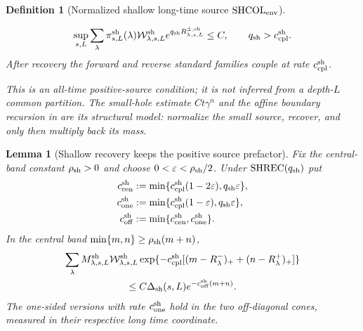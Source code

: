 \documentclass[11pt]{article}
\newtheorem{lemma}[theorem]{Lemma}
\newtheorem{definition}[theorem]{Definition}
\begin{document}
\begin{definition}[Normalized shallow long-time source
$\mathrm{SHCOL}_{\rm env}$]
\begin{enumerate}[label=\textup{(SH\arabic*)}]
      \begin{equation}
      \label{eq:normalized-shallow-recovery}
       \sup_{s,L}\sum_\lambda\pi^{\rm sh}_{s,L}(\lambda)
       \mathcal W^{\rm sh}_{\lambda,s,L}
       e^{q_{\rm sh}R^{\pm,\rm sh}_{\lambda,s,L}}\le C,
       \qquad q_{\rm sh}>c_{\rm cpl}^{\rm sh}.
      \end{equation}
      After recovery the forward and reverse standard families couple at
      rate $c_{\rm cpl}^{\rm sh}$.
\end{enumerate}
This is an all-time positive-source condition; it is not inferred from a
depth-$L$ common partition.  The small-hole estimate $Ct\gamma^n$ and the
affine boundary recursion in \cite{CanestrariHoles} are its structural
model: normalize the small source, recover, and only then multiply back its
mass.
\end{definition}

\begin{lemma}[Shallow recovery keeps the positive source prefactor]
\label{lem:normalized-shallow-recovery}
Fix the central-band constant $\rho_{\rm sh}>0$ and choose
$0<\varepsilon<\rho_{\rm sh}/2$.  Under
$\mathrm{SHREC}(q_{\rm sh})$ put
\begin{equation}
\label{eq:explicit-shallow-recovery-rate}
 \begin{aligned}
 c_{\rm cen}^{\rm sh}&:=
 \min\{c_{\rm cpl}^{\rm sh}(1-2\varepsilon),q_{\rm sh}\varepsilon\},\\
 c_{\rm one}^{\rm sh}&:=
 \min\{c_{\rm cpl}^{\rm sh}(1-\varepsilon),q_{\rm sh}\varepsilon\},\\
 c_{\rm off}^{\rm sh}&:=\min\{c_{\rm cen}^{\rm sh},c_{\rm one}^{\rm sh}\}.
 \end{aligned}
\end{equation}
In the central band $\min\{m,n\}\ge\rho_{\rm sh}(m+n)$,
\begin{multline}
\label{eq:weighted-shallow-delayed-coupling}
 \sum_\lambda M^{\rm sh}_{\lambda,s,L}
 \mathcal W^{\rm sh}_{\lambda,s,L}
 \exp\{-c_{\rm cpl}^{\rm sh}[(m-R^-_\lambda)_+
 +(n-R^+_\lambda)_+]\}\\
 \le C\Delta_{\rm sh}(s,L)e^{-c_{\rm off}^{\rm sh}(m+n)} .
\end{multline}
The one-sided versions with rate $c_{\rm one}^{\rm sh}$ hold in the two
off-diagonal cones, measured in their respective long time coordinate.
\end{lemma}
\end{document}
